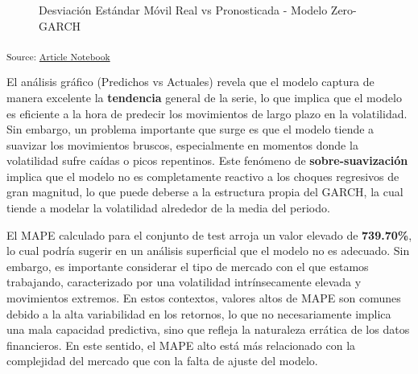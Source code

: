 \documentclass[
  number,
  preprint,
  3p,
  onecolumn]{elsarticle}
\begin{document}
\begin{figure}[H]


\caption{\label{fig-predicted-vs-actual-backtest}Desviación Estándar
Móvil Real vs Pronosticada - Modelo Zero-GARCH}

\end{figure}%

\textsubscript{Source:
\href{https://iancont.github.io/fixed_income_garch/index.qmd.html}{Article
Notebook}}

El análisis gráfico (Predichos vs Actuales) revela que el modelo captura
de manera excelente la \textbf{tendencia} general de la serie, lo que
implica que el modelo es eficiente a la hora de predecir los movimientos
de largo plazo en la volatilidad. Sin embargo, un problema importante
que surge es que el modelo tiende a suavizar los movimientos bruscos,
especialmente en momentos donde la volatilidad sufre caídas o picos
repentinos. Este fenómeno de \textbf{sobre-suavización} implica que el
modelo no es completamente reactivo a los choques regresivos de gran
magnitud, lo que puede deberse a la estructura propia del GARCH, la cual
tiende a modelar la volatilidad alrededor de la media del periodo.

El MAPE calculado para el conjunto de test arroja un valor elevado de
\textbf{739.70\%}, lo cual podría sugerir en un análisis superficial que
el modelo no es adecuado. Sin embargo, es importante considerar el tipo
de mercado con el que estamos trabajando, caracterizado por una
volatilidad intrínsecamente elevada y movimientos extremos. En estos
contextos, valores altos de MAPE son comunes debido a la alta
variabilidad en los retornos, lo que no necesariamente implica una mala
capacidad predictiva, sino que refleja la naturaleza errática de los
datos financieros. En este sentido, el MAPE alto está más relacionado
con la complejidad del mercado que con la falta de ajuste del modelo.
\end{document}
